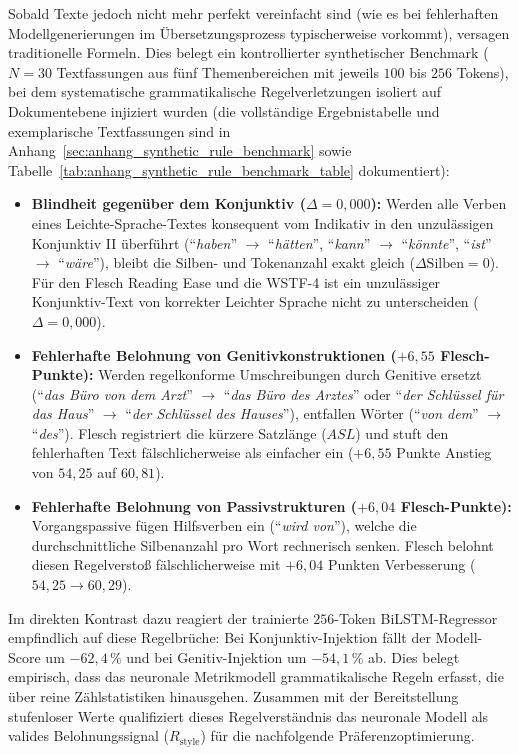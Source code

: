 Sobald Texte jedoch nicht mehr perfekt vereinfacht sind (wie es bei fehlerhaften Modellgenerierungen im Übersetzungsprozess typischerweise vorkommt), versagen traditionelle Formeln. Dies belegt ein kontrollierter synthetischer Benchmark ($N = 30$ Textfassungen aus fünf Themenbereichen mit jeweils $100$ bis $256$ Tokens), bei dem systematische grammatikalische Regelverletzungen isoliert auf Dokumentebene injiziert wurden (die vollständige Ergebnistabelle und exemplarische Textfassungen sind in Anhang~\ref{sec:anhang_synthetic_rule_benchmark} sowie Tabelle~\ref{tab:anhang_synthetic_rule_benchmark_table} dokumentiert):
\begin{itemize}
    \item \textbf{Blindheit gegenüber dem Konjunktiv ($\Delta = 0{,}000$):} Werden alle Verben eines Leichte-Sprache-Textes konsequent vom Indikativ in den unzulässigen Konjunktiv II überführt (\enquote{\textit{haben}} $\rightarrow$ \enquote{\textit{hätten}}, \enquote{\textit{kann}} $\rightarrow$ \enquote{\textit{könnte}}, \enquote{\textit{ist}} $\rightarrow$ \enquote{\textit{wäre}}), bleibt die Silben- und Tokenanzahl exakt gleich ($\Delta \text{Silben} = 0$). Für den Flesch Reading Ease und die WSTF-4 ist ein unzulässiger Konjunktiv-Text von korrekter Leichter Sprache nicht zu unterscheiden ($\Delta = 0{,}000$).
    \item \textbf{Fehlerhafte Belohnung von Genitivkonstruktionen ($+6{,}55$ Flesch-Punkte):} Werden regelkonforme Umschreibungen durch Genitive ersetzt (\enquote{\textit{das Büro von dem Arzt}} $\rightarrow$ \enquote{\textit{das Büro des Arztes}} oder \enquote{\textit{der Schlüssel für das Haus}} $\rightarrow$ \enquote{\textit{der Schlüssel des Hauses}}), entfallen Wörter (\enquote{\textit{von dem}} $\rightarrow$ \enquote{\textit{des}}). Flesch registriert die kürzere Satzlänge ($ASL$) und stuft den fehlerhaften Text fälschlicherweise als einfacher ein ($+6{,}55$ Punkte Anstieg von $54{,}25$ auf $60{,}81$).
    \item \textbf{Fehlerhafte Belohnung von Passivstrukturen ($+6{,}04$ Flesch-Punkte):} Vorgangspassive fügen Hilfsverben ein (\enquote{\textit{wird von}}), welche die durchschnittliche Silbenanzahl pro Wort rechnerisch senken. Flesch belohnt diesen Regelverstoß fälschlicherweise mit $+6{,}04$ Punkten Verbesserung ($54{,}25 \rightarrow 60{,}29$).
\end{itemize}

Im direkten Kontrast dazu reagiert der trainierte $256$-Token BiLSTM-Regressor empfindlich auf diese Regelbrüche: Bei Konjunktiv-Injektion fällt der Modell-Score um $-62{,}4\,\%$ und bei Genitiv-Injektion um $-54{,}1\,\%$ ab. Dies belegt empirisch, dass das neuronale Metrikmodell grammatikalische Regeln erfasst, die über reine Zählstatistiken hinausgehen. Zusammen mit der Bereitstellung stufenloser Werte qualifiziert dieses Regelverständnis das neuronale Modell als valides Belohnungssignal ($R_{\text{style}}$) für die nachfolgende Präferenzoptimierung.

